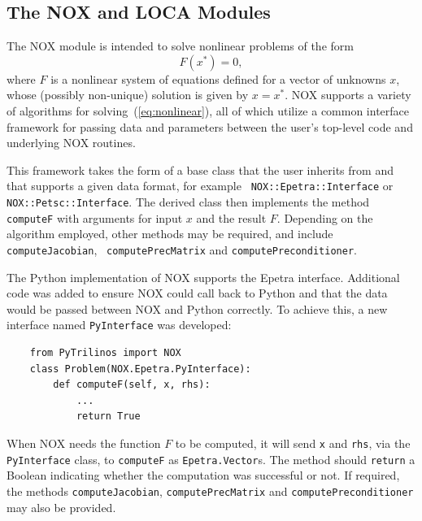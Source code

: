 \documentclass[acmtocl]{acmtrans2m}
\begin{document}
\subsection{The NOX and LOCA Modules}
\label{subsec:nox}

The NOX module is intended to solve nonlinear problems of the form
\begin{equation}
  \label{eq:nonlinear}
  F(x^*) = 0,
\end{equation}
where $F$ is a nonlinear system of equations defined for a vector of
unknowns $x$, whose (possibly non-unique) solution is given by
$x=x^*$.  NOX supports a variety of algorithms for
solving~(\ref{eq:nonlinear}), all of which utilize a common interface
framework for passing data and parameters between the user's top-level
code and underlying NOX routines.

This framework takes the form of a base class that the user inherits
from and that supports a given data format, for example {\tt
  NOX::Epetra::Interface} or {\tt NOX::Petsc::Interface}.  The derived
class then implements the method {\tt computeF} with arguments for
input $x$ and the result $F$.  Depending on the algorithm employed,
other methods may be required, and include {\tt computeJacobian}, {\tt
  computePrecMatrix} and {\tt computePreconditioner}.

The Python implementation of NOX supports the Epetra interface.
Additional code was added to ensure NOX could call back to Python and
that the data would be passed between NOX and Python correctly.  To
achieve this, a new interface named {\tt PyInterface} was developed:
\begin{verbatim}
    from PyTrilinos import NOX
    class Problem(NOX.Epetra.PyInterface):
        def computeF(self, x, rhs):
            ...
            return True
\end{verbatim}
When NOX needs the function $F$ to be computed, it will send {\tt x}
and {\tt rhs}, via the {\tt PyInterface} class, to {\tt computeF} as
{\tt Epetra.Vector}s.  The method should {\tt return} a Boolean
indicating whether the computation was successful or not.  If
required, the methods {\tt computeJacobian}, {\tt computePrecMatrix}
and {\tt computePreconditioner} may also be provided.
\end{document}
